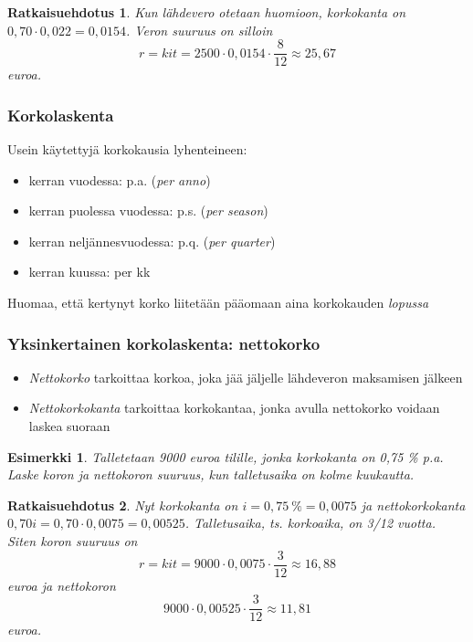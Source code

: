 \documentclass[]{beamer}\usepackage[]{graphicx}\usepackage[]{color}
\newtheorem{esim}{Esimerkki}
\newtheorem{ratkaisu}{Ratkaisuehdotus}
\begin{document}
\begin{frame}
    \pause
    \begin{ratkaisu}
        Kun lähdevero otetaan huomioon, korkokanta on \(0,70\cdot 0,022 = 0{,}0154\). \pause Veron suuruus on silloin
        \[
            r = kit = 2500\cdot 0{,}0154 \cdot \frac{8}{12}\approx 25,67
         \]
         euroa.
    \end{ratkaisu}
\end{frame}

\begin{frame}
    \frametitle{Korkolaskenta}
    \pause Usein käytettyjä korkokausia lyhenteineen:
    \begin{itemize}
        \item kerran vuodessa: p.a. (\emph{per anno}) \pause
        \item kerran puolessa vuodessa: p.s. (\emph{per season}) \pause
        \item kerran neljännesvuodessa: p.q. (\emph{per quarter}) \pause
        \item kerran kuussa: per kk \pause
    \end{itemize}
    Huomaa, että kertynyt korko liitetään pääomaan aina korkokauden \emph{lopussa}
\end{frame}


\begin{frame}
    \frametitle{Yksinkertainen korkolaskenta: nettokorko}
    \pause
    \begin{itemize}
        \item \emph{Nettokorko} tarkoittaa korkoa, joka jää jäljelle lähdeveron maksamisen jälkeen
        \item \emph{Nettokorkokanta} tarkoittaa korkokantaa, jonka avulla nettokorko voidaan laskea suoraan
    \end{itemize}
    \pause
    \begin{esim}
        Talletetaan 9000 euroa tilille, jonka korkokanta on 0,75 \% p.a.
        \pause Laske koron ja nettokoron suuruus, kun talletusaika on kolme kuukautta.
    \end{esim}
    \pause
\end{frame}

\begin{frame}
    \begin{ratkaisu}
        Nyt korkokanta on \pause $i = 0{,}75 \ \%  = 0{,}0075$ ja nettokorkokanta \pause $0{,}70i = 0{,}70 \cdot 0{,}0075 = 0,00525$.
        Talletusaika, ts. korkoaika, on 3/12 vuotta. Siten koron suuruus on
        \[
            r = kit = 9000\cdot 0,0075\cdot \frac{3}{12}\approx 16,88
        \]
        euroa ja nettokoron
        \[
            9000\cdot 0,00525\cdot\frac{3}{12}\approx 11,81
        \]
        euroa.
    \end{ratkaisu}
\end{frame}
\end{document}
